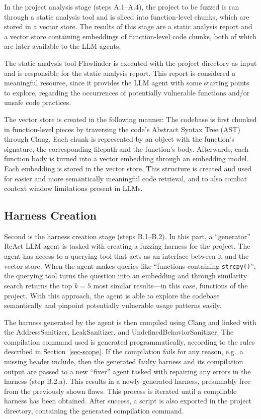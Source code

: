 \documentclass[
  a4paper,
]{scrreprt}
\theoremstyle{definition}
\theoremstyle{remark}
\begin{document}
In the project analysis stage (steps A.1--A.4), the project to be fuzzed
is ran through a static analysis tool and is sliced into function-level
chunks, which are stored in a vector store. The results of this stage
are a static analysis report and a vector store containing embeddings of
function-level code chunks, both of which are later available to the LLM
agents.

The static analysis tool Flawfinder \autocite{flawfinder} is executed
with the project directory as input and is responsible for the static
analysis report. This report is considered a meaningful resource, since
it provides the LLM agent with some starting points to explore,
regarding the occurrences of potentially vulnerable functions and/or
unsafe code practices.

The vector store is created in the following manner: The codebase is
first chunked in function-level pieces by traversing the code's Abstract
Syntax Tree (AST) through Clang. Each chunk is represented by an object
with the function's signature, the corresponding filepath and the
function's body. Afterwards, each function body is turned into a vector
embedding through an embedding model. Each embedding is stored in the
vector store. This structure is created and used for easier and more
semantically meaningful code retrieval, and to also combat context
window limitations present in LLMs.

\subsection{Harness Creation}\label{sec-creation}

Second is the harness creation stage (steps B.1--B.2). In this part, a
``generator'' ReAct LLM agent is tasked with creating a fuzzing harness
for the project. The agent has access to a querying tool that acts as an
interface between it and the vector store. When the agent makes queries
like ``functions containing \texttt{strcpy()}'', the querying tool turns
the question into an embedding and through similarity search returns the
top \(k=5\) most similar results---in this case, functions of the
project. With this approach, the agent is able to explore the codebase
semantically and pinpoint potentially vulnerable usage patterns easily.

The harness generated by the agent is then compiled using Clang and
linked with the AddressSanitizer, LeakSanitizer, and
UndefinedBehaviorSanitizer. The compilation command used is generated
programmatically, according to the rules described in
Section~\ref{sec-scope}. If the compilation fails for any reason, e.g.~a
missing header include, then the generated faulty harness and its
compilation output are passed to a new ``fixer'' agent tasked with
repairing any errors in the harness (step B.2.a). This results in a
newly generated harness, presumably free from the previously shown
flaws. This process is iterated until a compilable harness has been
obtained. After success, a script is also exported in the project
directory, containing the generated compilation command.
\end{document}
